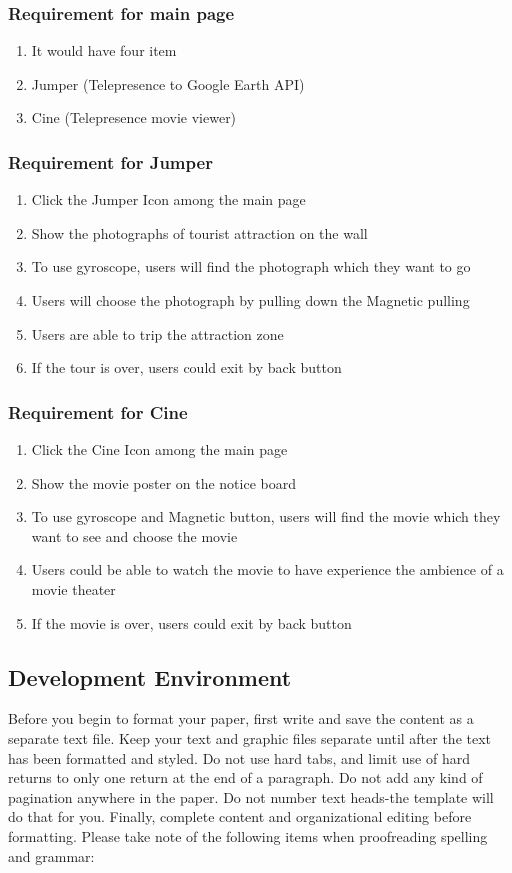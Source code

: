\documentclass[12pt]{article}
\begin{document}
\subsubsection{Requirement for main page}
\begin{enumerate}
\item It would have four item
\item Jumper (Telepresence to Google Earth API)
\item Cine (Telepresence movie viewer)
\end{enumerate}

\subsubsection{Requirement for Jumper}
\begin{enumerate}
\item Click the Jumper Icon among the main page
\item Show the photographs of tourist attraction on the wall
\item To use gyroscope, users will  find the photograph which they want to go
\item Users will choose the photograph by pulling down the Magnetic pulling
\item Users are able to trip the attraction zone
\item If the tour is over, users could exit by back button
\end{enumerate}

\subsubsection{Requirement for Cine}
\begin{enumerate}
\item Click the Cine Icon among the main page
\item Show the movie poster on the notice board
\item To use gyroscope and Magnetic button, users will find the movie which they want to see and choose the movie
\item Users could be able to watch the movie to have experience the ambience of a movie theater
\item If the movie is over, users could exit by back button
\end{enumerate}

\subsection{Development Environment}
Before you begin to format your paper, first write and save the content as a separate text file. Keep your text and graphic files separate until after the text has been formatted and styled. Do not use hard tabs, and limit use of hard returns to only one return at the end of a paragraph. Do not add any kind of pagination anywhere in the paper. Do not number text heads-the template will do that for you.
Finally, complete content and organizational editing before formatting. Please take note of the following items when proofreading spelling and grammar:
\end{document}
